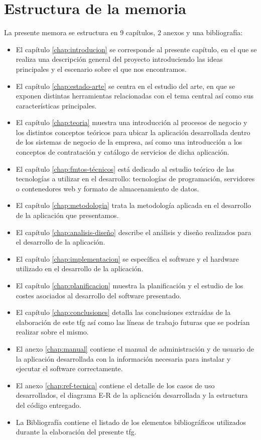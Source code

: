 \section{Estructura de la memoria}
\label{sec:estructura}

La presente memora se estructura en 9 capítulos, 2 anexos y una bibliografía:

\begin{itemize}
\item El capítulo \ref{chap:introducion} se corresponde al presente capítulo, en el que se realiza una descripción general del proyecto
introduciendo las ideas principales y el escenario sobre el que nos encontramos.
\item El capítulo \ref{chap:estado-arte} se centra en el estudio del arte, en que se exponen distintas herramientas relacionadas con el tema central así como sus características principales.
\item El capítulo \ref{chap:teoria} muestra una introducción al procesos de negocio y los distintos conceptos teóricos para ubicar la aplicación desarrollada dentro de los sistemas de negocio de la empresa, así como una introducción a los conceptos de contratación y catálogo de servicios de dicha aplicación.
\item El capítulo \ref{chap:fmtos-técnicos} está dedicado al estudio teórico de las tecnologías a utilizar en el desarrollo: tecnologías de programación, servidores o contenedores web y formato de almacenamiento de datos.
\item El capítulo \ref{chap:metodologia} trata la metodología aplicada en el desarrollo de la aplicación que presentamos.
\item El capítulo \ref{chap:analisis-diseño} describe el análisis y diseño realizados para el desarrollo de la aplicación.
\item El capítulo \ref{chap:implementacion} se específica el software y el
hardware utilizado en el desarrollo de la aplicación.
\item El capítulo \ref{chap:planificacion} muestra la planificación y el estudio de los costes asociados al desarrollo del software presentado.
\item El capítulo \ref{chap:conclusiones} detalla las conclusiones extraídas de la elaboración de este \acrshort{tfg} así como las líneas de trabajo futuras que se podrían realizar sobre el mismo.
\item El anexo \ref{chap:manual} contiene el manual de administración y de usuario de la aplicación desarrollada con la información necesaria para instalar y ejecutar el software correctamente.
\item El anexo \ref{chap:ref-tecnica} contiene el detalle de los casos de uso desarrollados, el diagrama E-R de la aplicación desarrollada y la estructura del código entregado.
\item La Bibliografía contiene el listado de los elementos bibliográficos utilizados durante la elaboración del presente \acrshort{tfg}.
\end{itemize}
